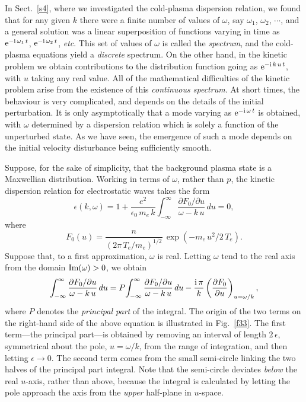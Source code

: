 In Sect.~\ref{s4}, where we investigated the cold-plasma dispersion relation, we found that
for any given $k$ there were a finite number of values of $\omega$, say $\omega_1$,
$\omega_2$, $\cdots$, and a general solution was a linear superposition of
functions varying in time as ${\rm e}^{-{\rm i}\,\omega_1\,t}$,  ${\rm e}^{-{\rm i}\,\omega_2\,t}$, {\em etc}. This set of values of $\omega$ is called the
{\em spectrum}, and the cold-plasma equations yield a {\em discrete}\/  spectrum.
On the other hand, in the kinetic problem we obtain contributions
to the distribution function going as ${\rm e}^{-{\rm i}\,k\,u\,t}$,
with $u$ taking any real value. 
All of the mathematical difficulties of the kinetic
problem arise from the existence of this {\em continuous spectrum}. At
short times, the behaviour is very complicated, and depends on the details
of the initial perturbation. It is only asymptotically that a mode
varying as ${\rm e}^{-{\rm i}\,\omega\,t}$ is obtained, with $\omega$ determined
by a dispersion relation which is solely a function of the unperturbed state.
As we have seen, the emergence of such a mode depends on the initial velocity
disturbance being sufficiently smooth.

Suppose, for the sake of simplicity, that the background plasma state is a
Maxwellian distribution. Working in terms of $\omega$, rather than $p$, the kinetic dispersion
relation for electrostatic waves takes the form
\begin{equation}\label{e6.23}
\epsilon(k,\omega) =  1 + \frac{e^2}{\epsilon_0\,m_e\,k}
\int_{-\infty}^{\infty} \frac{\partial F_0/\partial u}{\omega-
k\,u}\,du=0,
\end{equation}
where
\begin{equation}
F_0(u) = \frac{n}{(2\pi\,T_e/m_e)^{1/2}}\,\exp(-m_e\,u^2/2\,T_e).
\end{equation}
Suppose that, to a first approximation, $\omega$ is real. Letting $\omega$
tend to the real axis from the domain ${\rm Im}(\omega)>0$, we obtain
\begin{equation}
\int_{-\infty}^{\infty} \frac{\partial F_0/\partial u}{\omega-
k\,u}\,du= P\!\int_{-\infty}^{\infty}\frac{\partial F_0/\partial u}{\omega-
k\,u}\,du - \frac{{\rm i}\,\pi}{k} \left(\frac{\partial F_0}{\partial u}
\right)_{u=\omega/k},
\end{equation}
where $P$ denotes the {\em principal part}\/ of the integral. The origin
of the two terms on the right-hand side of the above equation is illustrated
in Fig.~\ref{f33}. The first term---the principal part---is obtained by removing an
interval of length $2\,\epsilon$, symmetrical about the pole, $u=\omega/k$,
from the range of integration, and then letting $\epsilon\rightarrow 0$. The
second term comes from the small semi-circle linking the two halves of the
principal part integral. Note that the semi-circle deviates {\em below}\/ the
real $u$-axis, rather than above, because the integral is calculated by
letting the pole approach the axis from the {\em  upper}\/ half-plane 
in $u$-space. 

